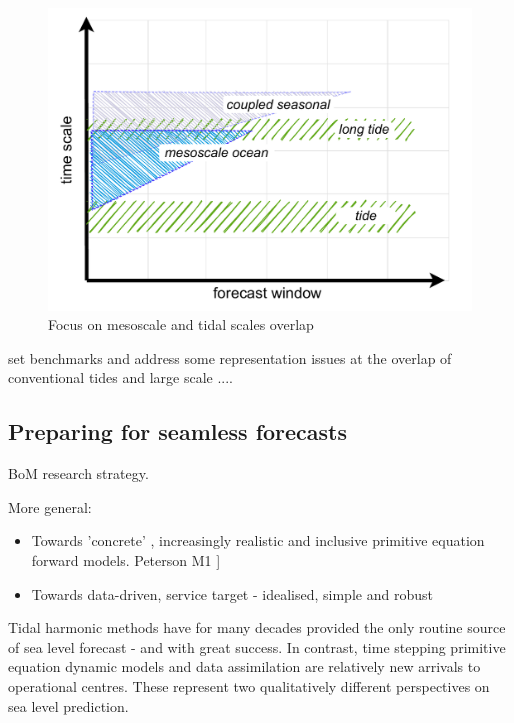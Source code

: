 \begin{figure}[H]\centering
  \includegraphics[width=\figwidthBig]{figures/diagrams/scales_focus.pdf}
  \caption{Focus on mesoscale and tidal scales overlap}
\end{figure}

set benchmarks and address some representation issues at the overlap of conventional tides and large scale ....

\subsection{Preparing for seamless forecasts}

BoM research strategy.


More general:

\begin{itemize}
  \item Towards 'concrete' , increasingly realistic and inclusive primitive equation forward models.
Peterson M1 ]\citep{Petersen:2012tr}
 \item Towards data-driven, service target - idealised, simple and robust 
\end{itemize}




Tidal harmonic methods have for many decades provided the only routine source of sea level forecast - and with great success.  
In contrast, time stepping primitive equation dynamic models and data assimilation are relatively new arrivals to operational centres.  
These represent two qualitatively different perspectives on sea level prediction.\\


